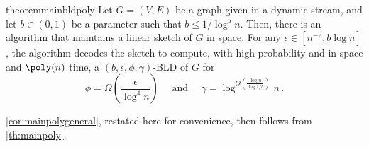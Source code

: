 \begin{restatable}{theorem}{mainbldpoly}
	\label{th:mainpoly}
	Let $G=(V, E)$ be a graph given in a dynamic stream, and let $b \in (0,1)$ be a parameter such that $b \le 1/\log^5 n$. Then, there is an algorithm that maintains a linear sketch of $G$ in  space. For any $\epsilon \in [n^{-2}, b \log n]$, the algorithm decodes the sketch to compute, with high probability and in  space and $\poly(n)$ time, a $(b, \epsilon, \phi, \gamma)$-BLD of $G$ for
	\begin{equation*}
		\phi = \Omega\left(\frac{\epsilon}{\log^4 n}\right) \quad \text{ and } \quad \gamma = \log^{O\left(\frac{\log n}{\log 1/b}\right)} n\, .
	\end{equation*}
\end{restatable}
\noindent
\cref{cor:mainpolygeneral}, restated here for convenience, then follows from \cref{th:mainpoly}.

